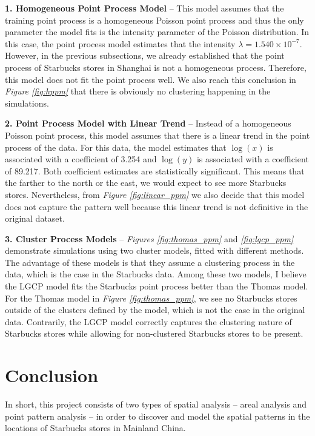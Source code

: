 \documentclass{article}
\begin{document}
\textbf{1. Homogeneous Point Process Model} -- This model assumes that the training point process is a homogeneous Poisson point process and thus the only parameter the model fits is the intensity parameter of the Poisson distribution. In this case, the point process model estimates that the intensity \(\lambda = 1.540 \times 10 ^ {-7}\). However, in the previous subsections, we already established that the point process of Starbucks stores in Shanghai is not a homogeneous process. Therefore, this model does not fit the point process well. We also reach this conclusion in \textit{Figure \ref{fig:hppm}} that there is obviously no clustering happening in the simulations.

\textbf{2. Point Process Model with Linear Trend} -- Instead of a homogeneous Poisson point process, this model assumes that there is a linear trend in the point process of the data. For this data, the model estimates that \(\log(x)\) is associated with a coefficient of 3.254 and \(\log(y)\) is associated with a coefficient of 89.217. Both coefficient estimates are statistically significant. This means that the farther to the north or the east, we would expect to see more Starbucks stores. Nevertheless, from \textit{Figure \ref{fig:linear_ppm}} we also decide that this model does not capture the pattern well because this linear trend is not definitive in the original dataset.

\textbf{3. Cluster Process Models} -- \textit{Figures \ref{fig:thomas_ppm}} and \textit{\ref{fig:lgcp_ppm}} demonstrate simulations using two cluster models, fitted with different methods. The advantage of these models is that they assume a clustering process in the data, which is the case in the Starbucks data. Among these two models, I believe the LGCP model fits the Starbucks point process better than the Thomas model. For the Thomas model in \textit{Figure \ref{fig:thomas_ppm}}, we see no Starbucks stores outside of the clusters defined by the model, which is not the case in the original data. Contrarily, the LGCP model correctly captures the clustering nature of Starbucks stores while allowing for non-clustered Starbucks stores to be present.

\section{Conclusion}

In short, this project consists of two types of spatial analysis -- areal analysis and point pattern analysis -- in order to discover and model the spatial patterns in the locations of Starbucks stores in Mainland China.
\end{document}
